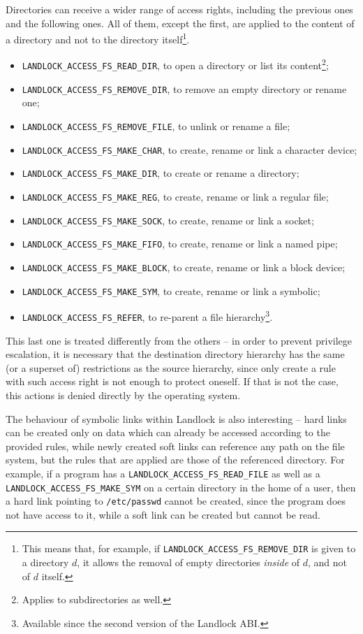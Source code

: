 Directories can receive a wider range of access rights, including the previous ones and the following ones.
All of them, except the first, are applied to the content of a directory and not to the directory
itself\footnote{This means that, for example, if \texttt{LANDLOCK\_ACCESS\_FS\_REMOVE\_DIR} is given to a directory $d$, it
allows the removal of empty directories \textit{inside} of $d$, and not of $d$ itself.}.
\begin{itemize}
  \item \texttt{LANDLOCK\_ACCESS\_FS\_READ\_DIR}, to open a directory or list its content\footnote{Applies to subdirectories as well.};
  \item \texttt{LANDLOCK\_ACCESS\_FS\_REMOVE\_DIR}, to remove an empty directory or rename one;
  \item \texttt{LANDLOCK\_ACCESS\_FS\_REMOVE\_FILE}, to unlink or rename a file;
  \item \texttt{LANDLOCK\_ACCESS\_FS\_MAKE\_CHAR}, to create, rename or link a character device;
  \item \texttt{LANDLOCK\_ACCESS\_FS\_MAKE\_DIR}, to create or rename a directory;
  \item \texttt{LANDLOCK\_ACCESS\_FS\_MAKE\_REG}, to create, rename or link a regular file;
  \item \texttt{LANDLOCK\_ACCESS\_FS\_MAKE\_SOCK}, to create, rename or link a socket;
  \item \texttt{LANDLOCK\_ACCESS\_FS\_MAKE\_FIFO}, to create, rename or link a named pipe;
  \item \texttt{LANDLOCK\_ACCESS\_FS\_MAKE\_BLOCK}, to create, rename or link a block device;
  \item \texttt{LANDLOCK\_ACCESS\_FS\_MAKE\_SYM}, to create, rename or link a symbolic;
  \item \texttt{LANDLOCK\_ACCESS\_FS\_REFER}, to re-parent a file hierarchy\footnote{Available since the second version of the Landlock ABI.}.
\end{itemize}

This last one is treated differently from the others -- in order to prevent privilege escalation,
it is necessary that the destination directory hierarchy has the same (or a superset of) restrictions
as the source hierarchy, since only create a rule with such access right is not enough to protect oneself.
If that is not the case, this actions is denied directly by the operating system.

The behaviour of symbolic links within Landlock is also interesting -- hard links can be created only on data
which can already be accessed according to the provided rules, while newly created soft links can reference any path on the
file system, but the rules that are applied are those of the referenced directory.
For example, if a program has a \texttt{LANDLOCK\_ACCESS\_FS\_READ\_FILE}  as well as a 
\texttt{LANDLOCK\_ACCESS\_FS\_MAKE\_SYM} on a certain directory in the home of a user, then a hard link
pointing to \texttt{/etc/passwd} cannot be created, since the program does not have access to it, while a soft
link can be created but cannot be read.

